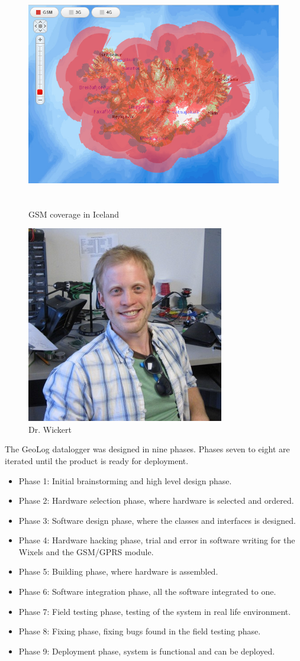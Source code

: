 \begin{figure}
        \centering
        \includegraphics[height=10cm]{graphics/GSM_Coverage}
        \caption{GSM coverage in Iceland\cite{vodafone}}
        \label{fig:GSM_Coverage}
\end{figure}
\begin{figure}
\centering
\includegraphics[width=0.4\linewidth]{graphics/andrewWickert}
\caption{Dr. Wickert\label{fig:andrewWickert}\cite{andrewWickert}}
\end{figure}
The GeoLog datalogger was designed in nine phases. Phases seven to eight are iterated
until the product is ready for deployment.
\begin{itemize}
    \item{Phase 1:} Initial brainstorming and high level design phase.
    \item{Phase 2:} Hardware selection phase, where hardware is selected and ordered.
    \item{Phase 3:} Software design phase, where the classes and interfaces is designed.
    \item{Phase 4:} Hardware hacking phase, trial and error in software writing for the
                    Wixels\cite{wixel} and the GSM/GPRS module\cite{SM5100B}.
    \item{Phase 5:} Building phase, where hardware is assembled.
    \item{Phase 6:} Software integration phase, all the software integrated to one.
    \item{Phase 7:} Field testing phase, testing of the system in real life environment.
    \item{Phase 8:} Fixing phase, fixing bugs found in the field testing phase.
    \item{Phase 9:} Deployment phase, system is functional and can be deployed. 
\end{itemize}
